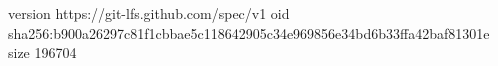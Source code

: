 version https://git-lfs.github.com/spec/v1
oid sha256:b900a26297c81f1cbbae5c118642905c34e969856e34bd6b33ffa42baf81301e
size 196704
